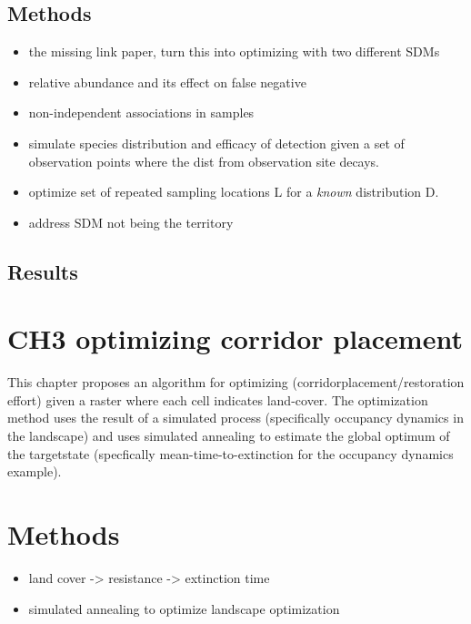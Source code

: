 \documentclass[10pt,oneside]{article}
\begin{document}
\hypertarget{methods-1}{%
\subsection{Methods}\label{methods-1}}

\begin{itemize}
\item
  the missing link paper, turn this into optimizing with two different
  SDMs
\item
  relative abundance and its effect on false negative
\item
  non-independent associations in samples
\item
  simulate species distribution and efficacy of detection given a set of
  observation points where the dist from observation site decays.
\item
  optimize set of repeated sampling locations L for a \emph{known}
  distribution D.
\item
  address SDM not being the territory
\end{itemize}

\hypertarget{results}{%
\subsection{Results}\label{results}}

\hypertarget{ch3-optimizing-corridor-placement}{%
\section{CH3 optimizing corridor
placement}\label{ch3-optimizing-corridor-placement}}

This chapter proposes an algorithm for optimizing
(corridorplacement/restoration effort) given a raster where each cell
indicates land-cover. The optimization method uses the result of a
simulated process (specifically occupancy dynamics in the landscape) and
uses simulated annealing to estimate the global optimum of the
targetstate (specfically mean-time-to-extinction for the occupancy
dynamics example).

\hypertarget{methods-2}{%
\section{Methods}\label{methods-2}}

\begin{itemize}
\tightlist
\item
  land cover -\textgreater{} resistance -\textgreater{} extinction time
\item
  simulated annealing to optimize landscape optimization
\end{itemize}
\end{document}
